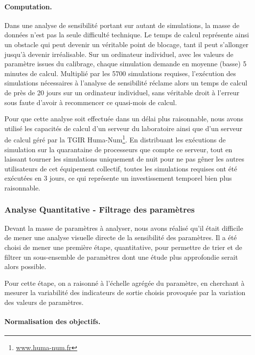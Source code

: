 \paragraph{Computation.}
Dans une analyse de sensibilité portant sur autant de simulations, la masse de données n'est pas la seule difficulté technique.
Le temps de calcul représente ainsi un obstacle qui peut devenir un véritable point de blocage, tant il peut s'allonger jusqu'à devenir irréalisable.
Sur un ordinateur individuel, avec les valeurs de paramètre issues du calibrage, chaque simulation demande en moyenne (basse) 5 minutes de calcul.
Multiplié par les 5700 simulations requises, l'exécution des simulations nécessaires à l'analyse de sensibilité réclame alors un temps de calcul de près de 20 jours sur un ordinateur individuel, sans véritable droit à l'erreur sous faute d'avoir à recommencer ce quasi-mois de calcul.

Pour que cette analyse soit effectuée dans un délai plus raisonnable, nous avons utilisé les capacités de calcul d'un serveur du laboratoire ainsi que d'un serveur de calcul géré par la TGIR Huma-Num\footnote{
\href{https://www.huma-num.fr}{www.huma-num.fr}
}.
En distribuant les exécutions de simulation sur la quarantaine de processeurs que compte ce serveur, tout en laissant tourner les simulations uniquement de nuit pour ne pas gêner les autres utilisateurs de cet équipement collectif, toutes les simulations requises ont été exécutées en 3 jours, ce qui représente un investissement temporel bien plus raisonnable.

\subsubsection{Analyse Quantitative - Filtrage des paramètres}

Devant la masse de paramètres à analyser, nous avons réalisé qu'il était difficile de mener une analyse visuelle directe de la sensibilité des paramètres.
Il a été choisi de mener une première étape, quantitative, pour permettre de trier et de filtrer un sous-ensemble de paramètres dont une étude plus approfondie serait alors possible.

Pour cette étape, on a raisonné à l'échelle agrégée du paramètre, en cherchant à mesurer la variabilité des indicateurs de sortie choisis provoquée par la variation des valeurs de paramètres.

\paragraph{Normalisation des objectifs.}

